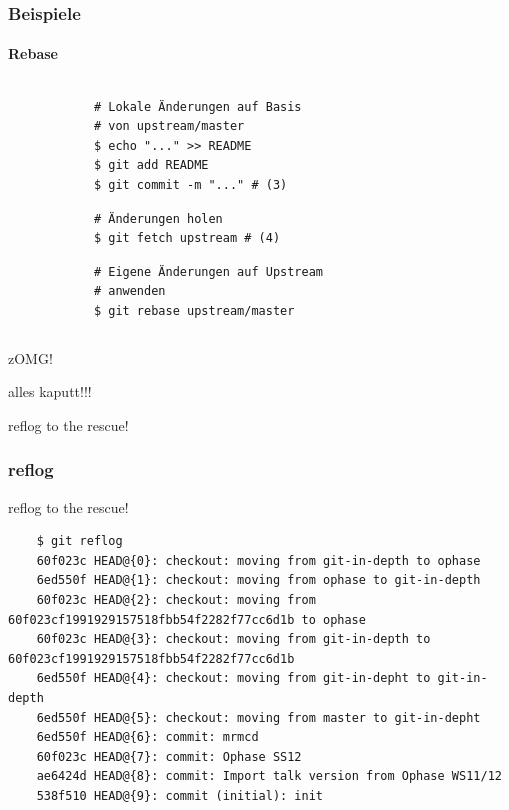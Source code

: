 \documentclass[]{beamer}
\begin{document}
\begin{frame}[fragile]
	\frametitle{Beispiele}
	\framesubtitle{Rebase}
	\begin{columns}[T]
		\begin{column}{7.5cm}
			\begin{verbatim}
			# Lokale Änderungen auf Basis
			# von upstream/master
			$ echo "..." >> README
			$ git add README
			$ git commit -m "..." # (3)
			\end{verbatim}

			\begin{verbatim}
			# Änderungen holen
			$ git fetch upstream # (4)
			\end{verbatim}

			\begin{verbatim}
			# Eigene Änderungen auf Upstream
			# anwenden
			$ git rebase upstream/master
			\end{verbatim}
		\end{column}
		\begin{column}{2.5cm}
		\end{column}
	\end{columns}
\end{frame}

\begin{frame}
	\fontsize{30}{10}\selectfont zOMG!
	\vspace*{0.5cm}

	\fontsize{20}{10}\selectfont alles kaputt!!!
	\vspace*{0.25cm}

	 {
		\fontsize{20}{10}\selectfont reflog to the rescue!
	}
\end{frame}

\begin{frame}[fragile]
	\frametitle{reflog}
	\fontsize{6}{10}\selectfont reflog to the rescue!
	\begin{verbatim}
	$ git reflog
	60f023c HEAD@{0}: checkout: moving from git-in-depth to ophase
	6ed550f HEAD@{1}: checkout: moving from ophase to git-in-depth
	60f023c HEAD@{2}: checkout: moving from 60f023cf1991929157518fbb54f2282f77cc6d1b to ophase
	60f023c HEAD@{3}: checkout: moving from git-in-depth to 60f023cf1991929157518fbb54f2282f77cc6d1b
	6ed550f HEAD@{4}: checkout: moving from git-in-depht to git-in-depth
	6ed550f HEAD@{5}: checkout: moving from master to git-in-depht
	6ed550f HEAD@{6}: commit: mrmcd
	60f023c HEAD@{7}: commit: Ophase SS12
	ae6424d HEAD@{8}: commit: Import talk version from Ophase WS11/12
	538f510 HEAD@{9}: commit (initial): init
	\end{verbatim}
\end{frame}
\end{document}
